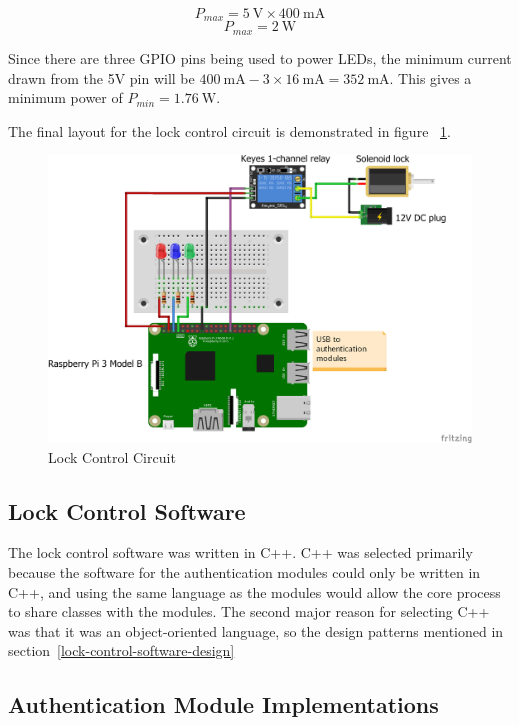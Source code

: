 \documentclass[12pt]{report}
\let\Oldsubsection\subsection
\renewcommand{\subsection}{\FloatBarrier\Oldsubsection}
\begin{document}
\begin{enumerate}
$$ P_{max} = \SI{5}{\volt} \times \SI{400}{\milli\ampere} $$
$$ P_{max} = \SI{2}{\watt} $$

Since there are three GPIO pins being used to power LEDs, the minimum current drawn from the 5V pin will be $ 
\SI{400}{\milli\ampere} - 3 \times \SI{16}{\milli\ampere} = \SI{352}{\milli\ampere} $. This gives a minimum power of $ 
P_{min} = \SI{1.76}{\watt} $.

\end{enumerate}

The final layout for the lock control circuit is demonstrated in figure ~\ref{fig:lock-control-circuit-diagram}.

\begin{figure}
    \includegraphics[width=\textwidth]{Diagrams/hardware_lock_control}
    \caption{Lock Control Circuit}
    \label{fig:lock-control-circuit-diagram}
\end{figure}

\subsection{Lock Control Software} \label{lock-control-software}

The lock control software was written in C++. C++ was selected primarily because the software for the authentication 
modules could only be written in C++, and using the same language as the modules would allow the core process to share 
classes with the modules. The second major reason for selecting C++ was that it was an object-oriented language, so the 
design patterns mentioned in section~\ref{lock-control-software-design}

\subsection{Authentication Module Implementations} \label{authentication-modules-implementations}
\end{document}
